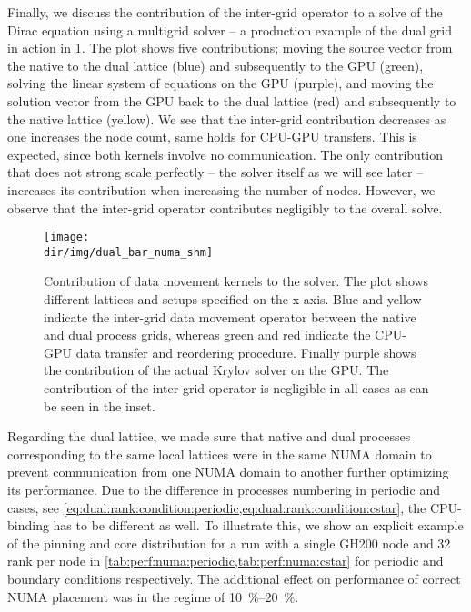 Finally, we discuss the contribution of the inter-grid operator to a solve of the Dirac equation using a multigrid solver -- a production example of the dual grid in action in \cref{fig:dual:bar}.
The plot shows five contributions; moving the source vector from the native to the dual lattice (blue) and subsequently to the GPU (green), solving the linear system of equations on the GPU (purple), and moving the solution vector from the GPU back to the dual lattice (red) and subsequently to the native lattice (yellow).
We see that the inter-grid contribution decreases as one increases the node count, same holds for CPU-GPU transfers.
This is expected, since both kernels involve no communication.
The only contribution that does not strong scale perfectly -- the solver itself as we will see later -- increases its contribution when increasing the number of nodes.
However, we observe that the inter-grid operator contributes negligibly to the overall solve.
\begin{figure}
    \centering
    \texttt{[image: \\dir/img/dual\_bar\_numa\_shm]}
    \caption{Contribution of data movement kernels to the solver. The plot shows different lattices and setups specified on the x-axis. Blue and yellow indicate the inter-grid data movement operator between the native and dual process grids, whereas green and red indicate the CPU-GPU data transfer and reordering procedure. Finally purple shows the contribution of the actual Krylov solver on the GPU. The contribution of the inter-grid operator is negligible in all cases as can be seen in the inset. }
    \label{fig:dual:bar}
\end{figure}

Regarding the dual lattice, we made sure that native and dual processes corresponding to the same local lattices were in the same NUMA domain to prevent communication from one NUMA domain to another further optimizing its performance.
Due to the difference in processes numbering in periodic and \Cstar cases, see \cref{eq:dual:rank:condition:periodic,eq:dual:rank:condition:cstar}, the CPU-binding has to be different as well.
To illustrate this, we show an explicit example of the pinning and core distribution for a run with a single GH200 node and \num{32} rank per node in \cref{tab:perf:numa:periodic,tab:perf:numa:cstar} for periodic and \Cstar boundary conditions respectively.
The additional effect on performance of correct NUMA placement was in the regime of \SIrange{10}{20}{\percent}.

